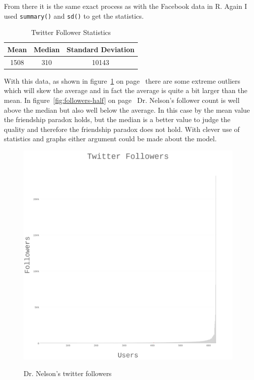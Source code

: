 \documentclass[12pt, a4paper]{article}
\newcommand{\code}[1]{\texttt{#1}}
\begin{document}
\noindent
From there it is the same exact process as with the Facebook data in R.
Again I used \code{summary()} and \code{sd()} to get the statistics.

\vspace{2em}
\begin{table}[h]
    \centering
    \begin{tabular}{|c|c|c|}
        \hline
        \textbf{Mean} & \textbf{Median} & \textbf{Standard Deviation} \\ \hline
        1508          & 310             & 10143                       \\ \hline
    \end{tabular}
    \caption{Twitter Follower Statistics}
\end{table}
\vspace{2em}

\noindent
With this data, as shown in figure~\ref{fig:followers-full} on
page~\pageref{fig:followers-full} there are some extreme
outliers which will skew the average and in fact the average is
quite a bit larger than the mean. In figure~\ref{fig:followers-half}
on page~\pageref{fig:followers-half} Dr. Nelson's follower count is
well above the median but also well below the average.
In this case by the mean value the friendship paradox holds, but
the median is a better value to judge the quality and
therefore the friendship paradox does not hold. With clever use
of statistics and graphs either argument could be made about the
model.


\begin{figure}[p]
    \centering
    \href{http://datenstrom.gitlab.io/cs532-s17/notebooks/followers.html}{
    \includegraphics[width=\textwidth]{dia/followers_full.png}
    }
    \caption{Dr. Nelson's twitter followers}
    \label{fig:followers-full}
\end{figure}
\end{document}

